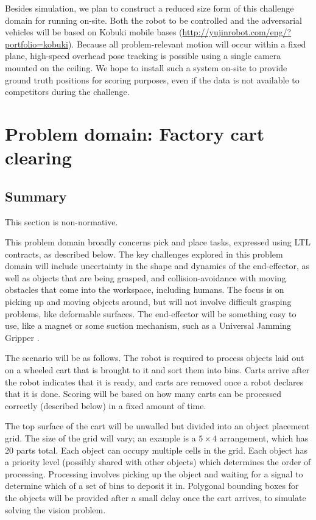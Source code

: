 \documentclass{amsart}
\theoremstyle{definition}
\begin{document}
Besides simulation, we plan to construct a reduced size form of this challenge
domain for running on-site.  Both the robot to be controlled and the
adversarial vehicles will be based on Kobuki mobile bases
(\url{http://yujinrobot.com/eng/?portfolio=kobuki}).  Because all
problem-relevant motion will occur within a fixed plane, high-speed overhead
pose tracking is possible using a single camera mounted on the ceiling.  We hope
to install such a system on-site to provide ground truth positions for
scoring purposes, even if the data is not available to competitors during the
challenge.

\section{Problem domain: Factory cart clearing}\label{sec:cartclearing}

\subsection{Summary}

This section is non-normative.\newline

This problem domain broadly concerns pick and place tasks, expressed using LTL
contracts, as described below. The key challenges explored in this problem
domain will include uncertainty in the shape and dynamics of the end-effector,
as well as objects that are being grasped, and collision-avoidance with moving
obstacles that come into the workspace, including humans. The focus is on
picking up and moving objects around, but will not involve difficult grasping
problems, like deformable surfaces. The end-effector will be something easy to
use, like a magnet or some suction mechanism, such as a Universal Jamming
Gripper \cite{AmendBRJL12}.

The scenario will be as follows. The robot is required to process objects laid
out on a wheeled cart that is brought to it and sort them into bins. Carts arrive after
the robot indicates that it is ready, and carts are removed once a robot
declares that it is done. Scoring will be based on how many carts can be
processed correctly (described below) in a fixed amount of time.

The top surface of the cart will be unwalled but divided into an object
placement grid. The size of the grid will vary; an example is a $5 \times 4$
arrangement, which has 20 parts total. Each object can occupy multiple cells in the
grid. Each object has a priority level (possibly shared with other objects)
which determines the order of processing. Processing involves picking up the
object and waiting for a signal to determine which of a set of bins to deposit
it in. Polygonal bounding boxes for the objects will be provided after a small
delay once the cart arrives, to simulate solving the vision problem.
\end{document}

